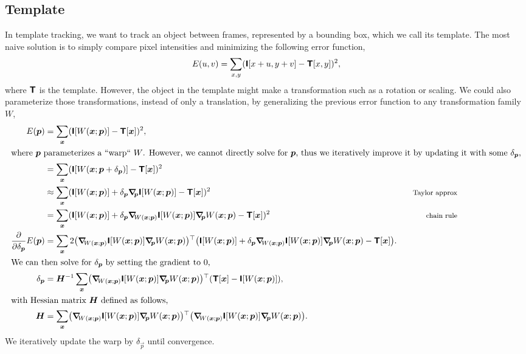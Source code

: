 \subsection{Template}

In template tracking, we want to track an object between frames, represented by
a bounding box, which we call its template. The most naive solution is to
simply compare pixel intensities and minimizing the following error function, \[
  E(u,v) = \sum_{x,y} (\bm{\mathsf{I}}[x+u,y+v] - \bm{\mathsf{T}}[x,y])^2
,\]
where $\bm{\mathsf{T}}$ is the template. However, the object in the template might
make a transformation such as a rotation or scaling. We could also parameterize
those transformations, instead of only a translation, by generalizing the
previous error function to any transformation family $W$,
\begin{align*}
  E(\vec{p}) &= \sum_{\vec{x}} \lft( \tens{I}[W(\vec{x}; \vec{p})] - \tens{T}[\vec{x}] \rgt)^2, \\
  \intertext{where $\vec{p}$ parameterizes a ``warp`` $W$. However, we cannot
  directly solve for $\vec{p}$, thus we iteratively improve it by updating it
  with some $\delta_{\vec{p}}$,}
  &= \sum_{\vec{x}} \lft( \tens{I}[W(\vec{x};\vec{p} + \delta_{\vec{p}})] - \tens{T}[\vec{x}] \rgt)^2 \\
  &\approx \sum_{\vec{x}} \lft( \tens{I}[W(\vec{x};\vec{p})] + \delta_{\vec{p}} \grad{\tens{I}[W(\vec{x};\vec{p})]}{\vec{p}} - \tens{T}[\vec{x}] \rgt)^2 & \text{\footnotesize Taylor approx} \\
  &= \sum_{\vec{x}} ( \tens{I}[W(\vec{x};\vec{p})] + \delta_{\vec{p}} \grad{\tens{I}[W(\vec{x};\vec{p})]}{W(\vec{x};\vec{p})} \grad{W(\vec{x};\vec{p})}{\vec{p}} - \tens{T}[\vec{x}] )^2 & \text{\footnotesize chain rule} \\
  \pdv*{E(\vec{p})}{\delta_{\vec{p}}} &= \sum_{\vec{x}} 2 \transpose{\lft( \grad{\tens{I}[W(\vec{x};\vec{p})]}{W(\vec{x};\vec{p})} \grad{W(\vec{x};\vec{p})}{\vec{p}} \rgt)} \lft( \tens{I}[W(\vec{x};\vec{p})] + \delta_{\vec{p}} \grad{\tens{I}[W(\vec{x};\vec{p})]}{W(\vec{x};\vec{p})} \grad{W(\vec{x};\vec{p})}{\vec{p}} - \tens{T}[\vec{x}] \rgt). \\
  \intertext{We can then solve for $\delta_{\vec{p}}$ by setting the gradient to 0,}
  \delta_{\vec{p}} &= \inv{\mat{H}} \sum_{\vec{x}} \transpose{ \lft( \grad{\tens{I}[W(\vec{x};\vec{p})]}{W(\vec{x};\vec{p})} \grad{W(\vec{x};\vec{p})}{\vec{p}} \rgt)} \lft( \tens{T}[\vec{x}] - \tens{I}[W(\vec{x};\vec{p})] \rgt), \\
  \intertext{with Hessian matrix $\mat{H}$ defined as follows,}
  \mat{H} &= \sum_{\vec{x}} \transpose{ \lft( \grad{\tens{I}[W(\vec{x};\vec{p})]}{W(\vec{x};\vec{p})} \grad{W(\vec{x};\vec{p})}{\vec{p}} \rgt)}  \lft( \grad{\tens{I}[W(\vec{x};\vec{p})]}{W(\vec{x};\vec{p})} \grad{W(\vec{x};\vec{p})}{\vec{p}} \rgt)
.\end{align*}
We iteratively update the warp by $\delta_{\vec{p}}$ until convergence.

